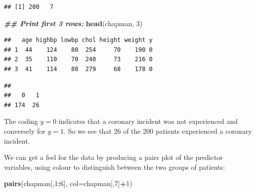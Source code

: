 \documentclass[
]{article}
\newenvironment{Shaded}{\begin{snugshade}}{\end{snugshade}}
\newcommand{\AttributeTok}[1]{\textcolor[rgb]{0.13,0.29,0.53}{#1}}
\newcommand{\DecValTok}[1]{\textcolor[rgb]{0.00,0.00,0.81}{#1}}
\newcommand{\DocumentationTok}[1]{\textcolor[rgb]{0.56,0.35,0.01}{\textbf{\textit{#1}}}}
\newcommand{\FunctionTok}[1]{\textcolor[rgb]{0.13,0.29,0.53}{\textbf{#1}}}
\newcommand{\NormalTok}[1]{#1}
\newcommand{\SpecialCharTok}[1]{\textcolor[rgb]{0.81,0.36,0.00}{\textbf{#1}}}
\begin{document}
\begin{verbatim}
## [1] 200   7
\end{verbatim}

\begin{Shaded}
\begin{Highlighting}[]
\DocumentationTok{\#\# Print first 3 rows:}
\FunctionTok{head}\NormalTok{(chapman, }\DecValTok{3}\NormalTok{)}
\end{Highlighting}
\end{Shaded}

\begin{verbatim}
##   age highbp lowbp chol height weight y
## 1  44    124    80  254     70    190 0
## 2  35    110    70  240     73    216 0
## 3  41    114    80  279     68    178 0
\end{verbatim}

\begin{Shaded}
\end{Shaded}

\begin{verbatim}
## 
##   0   1 
## 174  26
\end{verbatim}

The coding \(y=0\) indicates that a coronary incident was not
experienced and conversely for \(y=1\). So we see that 26 of the 200
patients experienced a coronary incident.

We can get a feel for the data by producing a pairs plot of the
predictor variables, using colour to distinguish between the two groups
of patients:

\begin{Shaded}
\begin{Highlighting}[]
\FunctionTok{pairs}\NormalTok{(chapman[,}\DecValTok{1}\SpecialCharTok{:}\DecValTok{6}\NormalTok{], }\AttributeTok{col=}\NormalTok{chapman[,}\DecValTok{7}\NormalTok{]}\SpecialCharTok{+}\DecValTok{1}\NormalTok{)}
\end{Highlighting}
\end{Shaded}
\end{document}
